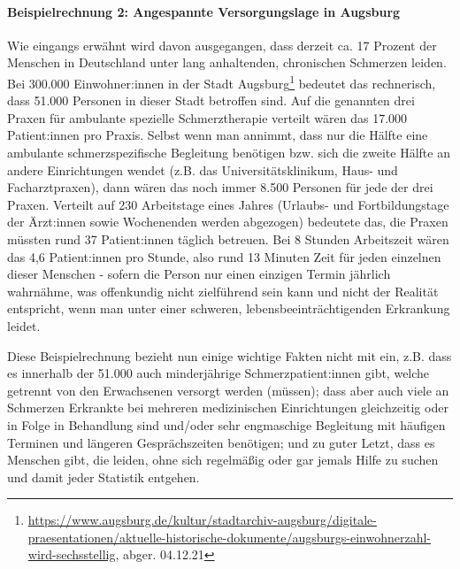 \documentclass[
  twoside,
  parskip=half-,
  paper=176mm:246mm,
  BCOR=14mm,
  DIV=14,
]{scrreprt}
\begin{document}
\paragraph{Beispielrechnung 2: Angespannte Versorgungslage in Augsburg}
Wie eingangs erwähnt wird davon ausgegangen, dass derzeit ca. 17 Prozent der Menschen in Deutschland unter lang anhaltenden, chronischen Schmerzen leiden. Bei 300.000 Einwohner:innen in der Stadt Augsburg\footnote{\url{https://www.augsburg.de/kultur/stadtarchiv-augsburg/digitale-praesentationen/aktuelle-historische-dokumente/augsburgs-einwohnerzahl-wird-sechsstellig},  abger. 04.12.21} bedeutet das rechnerisch, dass 51.000 Personen in dieser Stadt betroffen sind. Auf die genannten drei Praxen für ambulante spezielle Schmerztherapie verteilt wären das 17.000 Patient:innen pro Praxis. Selbst wenn man annimmt, dass nur die Hälfte eine ambulante schmerzspezifische Begleitung benötigen bzw. sich die zweite Hälfte an andere Einrichtungen wendet (z.B. das Universitätsklinikum, Haus- und Facharztpraxen), dann wären das noch immer 8.500 Personen für jede der drei Praxen. Verteilt auf 230 Arbeitstage eines Jahres (Urlaubs- und Fortbildungstage der Ärzt:innen sowie Wochenenden werden abgezogen) bedeutete das, die Praxen müssten rund 37 Patient:innen täglich betreuen. Bei 8 Stunden Arbeitszeit wären das 4,6 Patient:innen pro Stunde, also rund 13 Minuten Zeit für jeden einzelnen dieser Menschen - sofern die Person nur einen einzigen Termin jährlich wahrnähme, was offenkundig nicht zielführend sein kann und nicht der Realität entspricht, wenn man unter einer schweren, lebensbeeinträchtigenden Erkrankung leidet. 

Diese Beispielrechnung bezieht nun einige wichtige Fakten nicht mit ein, z.B. dass es innerhalb der 51.000 auch minderjährige Schmerzpatient:innen gibt, welche getrennt von den Erwachsenen versorgt werden (müssen); dass aber auch viele an Schmerzen Erkrankte bei mehreren medizinischen Einrichtungen gleichzeitig oder in Folge in Behandlung sind und/oder sehr engmaschige Begleitung mit häufigen Terminen und längeren Gesprächszeiten benötigen; und zu guter Letzt, dass es Menschen gibt, die  leiden, ohne sich regelmäßig oder gar jemals Hilfe zu suchen und damit jeder Statistik entgehen.
\end{document}
